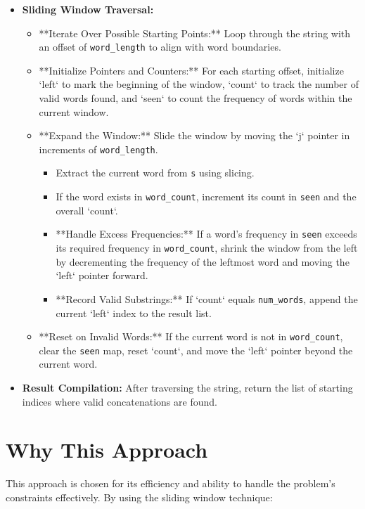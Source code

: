 \begin{itemize}
    \item \textbf{Sliding Window Traversal:}
    \begin{itemize}
        \item **Iterate Over Possible Starting Points:** Loop through the string with an offset of \texttt{word\_length} to align with word boundaries.
        \item **Initialize Pointers and Counters:** For each starting offset, initialize `left` to mark the beginning of the window, `count` to track the number of valid words found, and `seen` to count the frequency of words within the current window.
        \item **Expand the Window:** Slide the window by moving the `j` pointer in increments of \texttt{word\_length}.
            \begin{itemize}
                \item Extract the current word from \texttt{s} using slicing.
                \item If the word exists in \texttt{word\_count}, increment its count in \texttt{seen} and the overall `count`.
                \item **Handle Excess Frequencies:** If a word's frequency in \texttt{seen} exceeds its required frequency in \texttt{word\_count}, shrink the window from the left by decrementing the frequency of the leftmost word and moving the `left` pointer forward.
                \item **Record Valid Substrings:** If `count` equals \texttt{num\_words}, append the current `left` index to the result list.
            \end{itemize}
        \item **Reset on Invalid Words:** If the current word is not in \texttt{word\_count}, clear the \texttt{seen} map, reset `count`, and move the `left` pointer beyond the current word.
    \end{itemize}
    
    \item \textbf{Result Compilation:} After traversing the string, return the list of starting indices where valid concatenations are found.
\end{itemize}

\section*{Why This Approach}

This approach is chosen for its efficiency and ability to handle the problem's constraints effectively. By using the sliding window technique:

